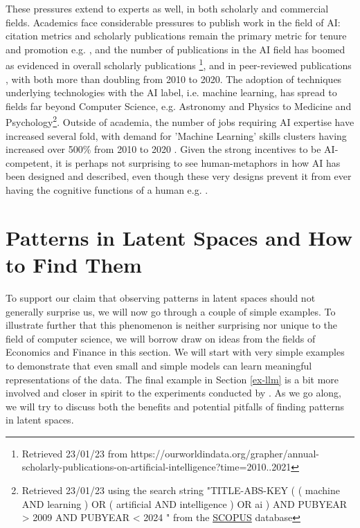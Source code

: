 \documentclass{article}
\theoremstyle{plain}
\theoremstyle{definition}
\theoremstyle{remark}
\begin{document}
These pressures extend to experts as well, in both scholarly and commercial fields. Academics face considerable pressures to publish work in the field of AI: citation metrics and scholarly publications remain the primary metric for tenure and promotion e.g. \cite{alperin2019significant}, and the number of publications in the AI field has boomed as evidenced in overall scholarly publications \footnote{ Retrieved 23/01/23 from https://ourworldindata.org/grapher/annual-scholarly-publications-on-artificial-intelligence?time=2010..2021 }, and in peer-reviewed publications \cite{Maslej2023-pi}, with both more than doubling from 2010 to 2020. The adoption of techniques underlying technologies with the AI label, i.e. machine learning, has spread to fields far beyond Computer Science, e.g. Astronomy and Physics to Medicine and Psychology\footnote{Retrieved 23/01/23 using the search string "TITLE-ABS-KEY ( ( machine  AND  learning )  OR  ( artificial  AND  intelligence )  OR  ai )  AND  PUBYEAR  >  2009  AND  PUBYEAR  <  2024 " from the \href{https://www.scopus.com/}{SCOPUS} database}. Outside of academia, the number of jobs requiring AI expertise have increased several fold, with demand for 'Machine Learning' skills clusters having increased over 500\% from 2010 to 2020 \cite{Maslej2023-pi}. Given the strong incentives to be AI-competent, it is perhaps not surprising to see human-metaphors in how AI has been designed and described, even though these very designs prevent it from ever having the cognitive functions of a human e.g. \cite{salles2020anthropomorphism, van2023reclaiming}. 

\section{Patterns in Latent Spaces and How to Find
Them}\label{patterns-in-latent-spaces-and-how-to-find-them}

To support our claim that observing patterns in latent spaces should not generally surprise us, we will now go through a couple of simple examples. To illustrate further that this phenomenon is neither surprising nor unique to the field of computer science, we will borrow draw on ideas from the fields of Economics and Finance in this section. We will start with very simple examples to demonstrate that even small and simple models can learn meaningful representations of the data. The final example in Section \ref{ex-llm} is a bit more involved and closer in spirit to the experiments conducted by \citet{gurnee2023language}. As we go along, we will try to discuss both the benefits and potential pitfalls of finding patterns in latent spaces.
\end{document}
